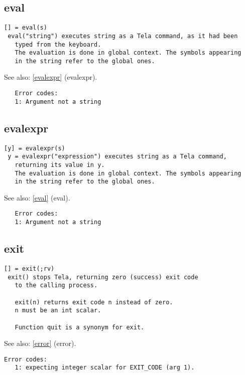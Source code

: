 \documentclass[a4paper]{article}
\begin{document}
\subsection{eval\label{eval}}

\begin{tscreen}
\begin{verbatim}
[] = eval(s)
 eval("string") executes string as a Tela command, as it had been
   typed from the keyboard.
   The evaluation is done in global context. The symbols appearing
   in the string refer to the global ones.
\end{verbatim}

See also: \ref{evalexpr} {(evalexpr)}.
\begin{verbatim}
   Error codes:
   1: Argument not a string 
\end{verbatim}
\end{tscreen}



\subsection{evalexpr\label{evalexpr}}

\begin{tscreen}
\begin{verbatim}
[y] = evalexpr(s)
 y = evalexpr("expression") executes string as a Tela command,
   returning its value in y.
   The evaluation is done in global context. The symbols appearing
   in the string refer to the global ones.
\end{verbatim}

See also: \ref{eval} {(eval)}.
\begin{verbatim}
   Error codes:
   1: Argument not a string 
\end{verbatim}
\end{tscreen}



\subsection{exit\label{exit}}

\begin{tscreen}
\begin{verbatim}
[] = exit(;rv)
 exit() stops Tela, returning zero (success) exit code
   to the calling process.

   exit(n) returns exit code n instead of zero.
   n must be an int scalar.

   Function quit is a synonym for exit.
\end{verbatim}

See also: \ref{error} {(error)}.
\begin{verbatim}
Error codes:
   1: expecting integer scalar for EXIT_CODE (arg 1).
\end{verbatim}
\end{tscreen}
\end{document}
